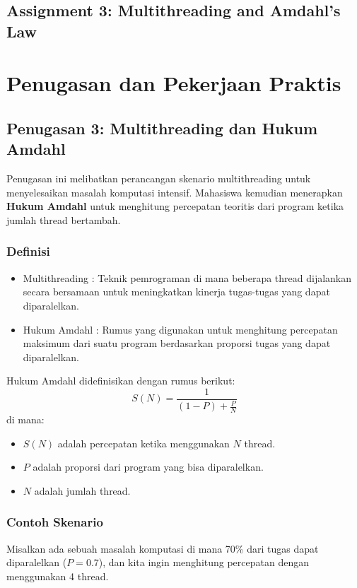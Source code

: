 \documentclass[12pt]{article}
\begin{document}
	
	
	\subsection{Assignment 3: Multithreading and Amdahl's Law}
	
	\section{Penugasan dan Pekerjaan Praktis}
	\subsection{Penugasan 3: Multithreading dan Hukum Amdahl}
	Penugasan ini melibatkan perancangan skenario multithreading untuk menyelesaikan masalah komputasi intensif. Mahasiswa kemudian menerapkan \textbf{Hukum Amdahl} untuk menghitung percepatan teoritis dari program ketika jumlah thread bertambah.
	
	\subsubsection{Definisi}
	\begin{itemize}
		\item Multithreading : Teknik pemrograman di mana beberapa thread dijalankan secara bersamaan untuk meningkatkan kinerja tugas-tugas yang dapat diparalelkan.
		\item Hukum Amdahl : Rumus yang digunakan untuk menghitung percepatan maksimum dari suatu program berdasarkan proporsi tugas yang dapat diparalelkan.
	\end{itemize}
	
	Hukum Amdahl didefinisikan dengan rumus berikut:
	\[
	S(N) = \frac{1}{(1 - P) + \frac{P}{N}}
	\]
	di mana:
	\begin{itemize}
		\item \( S(N) \) adalah percepatan ketika menggunakan \( N \) thread.
		\item \( P \) adalah proporsi dari program yang bisa diparalelkan.
		\item \( N \) adalah jumlah thread.
	\end{itemize}
	
	\subsubsection{Contoh Skenario}
	Misalkan ada sebuah masalah komputasi di mana 70\% dari tugas dapat diparalelkan (\( P = 0.7 \)), dan kita ingin menghitung percepatan dengan menggunakan 4 thread.
	
\end{document}
